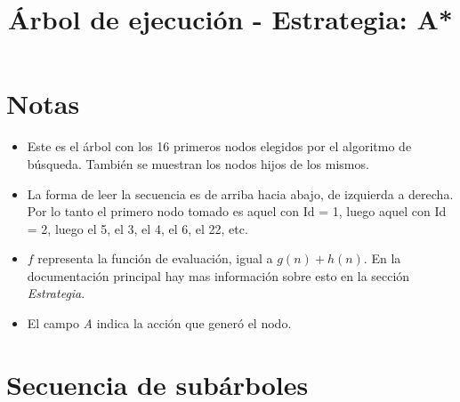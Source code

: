 \documentclass[a0,landscale]{a0poster}
\title{Árbol de ejecución - Estrategia: A*}
\author{}
\begin{document}
\maketitle

\section{Notas}

\begin{itemize}
\item Este es el árbol con los 16 primeros nodos elegidos por el algoritmo de
búsqueda. También se muestran los nodos hijos de los mismos.

\item La forma de leer la secuencia es de arriba hacia abajo, de izquierda a derecha.
Por lo tanto el primero nodo tomado es aquel con Id = 1, luego aquel con Id =
2, luego el 5, el 3, el 4, el 6, el 22, etc.

\item $f$ representa la función de evaluación, igual a $g(n) + h(n)$. En la
documentación principal hay mas información sobre esto en la sección
\emph{Estrategia}.

\item El campo \emph{A} indica la acción que generó el nodo.
\end{itemize}

\section{Secuencia de subárboles}
\end{document}
